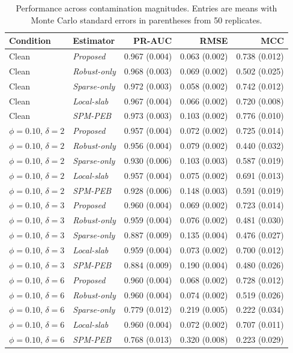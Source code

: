 \begin{table}[htbp]
\centering
\scriptsize
\setlength{\tabcolsep}{4pt}
\caption{Performance across contamination magnitudes. Entries are means with Monte Carlo standard errors in parentheses from 50 replicates.}
\label{tab:supp-magnitude}
\begin{tabular}{llrrr}
\toprule
Condition & Estimator & PR-AUC & RMSE & MCC\\
\midrule 
Clean & \emph{Proposed} & 0.967 (0.004) & 0.063 (0.002) & 0.738 (0.012)\\ 
Clean & \emph{Robust-only} & 0.968 (0.003) & 0.069 (0.002) & 0.502 (0.025)\\ 
Clean & \emph{Sparse-only} & 0.972 (0.003) & 0.058 (0.002) & 0.742 (0.012)\\ 
Clean & \emph{Local-slab} & 0.967 (0.004) & 0.066 (0.002) & 0.720 (0.008)\\ 
Clean & \emph{SPM-PEB} & 0.973 (0.003) & 0.103 (0.002) & 0.776 (0.010)\\ 
$\phi=0.10$, $\delta=2$ & \emph{Proposed} & 0.957 (0.004) & 0.072 (0.002) & 0.725 (0.014)\\ 
$\phi=0.10$, $\delta=2$ & \emph{Robust-only} & 0.956 (0.004) & 0.079 (0.002) & 0.440 (0.032)\\ 
$\phi=0.10$, $\delta=2$ & \emph{Sparse-only} & 0.930 (0.006) & 0.103 (0.003) & 0.587 (0.019)\\ 
$\phi=0.10$, $\delta=2$ & \emph{Local-slab} & 0.957 (0.004) & 0.075 (0.002) & 0.691 (0.013)\\ 
$\phi=0.10$, $\delta=2$ & \emph{SPM-PEB} & 0.928 (0.006) & 0.148 (0.003) & 0.591 (0.019)\\ 
$\phi=0.10$, $\delta=3$ & \emph{Proposed} & 0.960 (0.004) & 0.069 (0.002) & 0.723 (0.014)\\ 
$\phi=0.10$, $\delta=3$ & \emph{Robust-only} & 0.959 (0.004) & 0.076 (0.002) & 0.481 (0.030)\\ 
$\phi=0.10$, $\delta=3$ & \emph{Sparse-only} & 0.887 (0.009) & 0.135 (0.004) & 0.476 (0.027)\\ 
$\phi=0.10$, $\delta=3$ & \emph{Local-slab} & 0.959 (0.004) & 0.073 (0.002) & 0.700 (0.012)\\ 
$\phi=0.10$, $\delta=3$ & \emph{SPM-PEB} & 0.884 (0.009) & 0.190 (0.004) & 0.480 (0.026)\\ 
$\phi=0.10$, $\delta=6$ & \emph{Proposed} & 0.960 (0.004) & 0.068 (0.002) & 0.728 (0.012)\\ 
$\phi=0.10$, $\delta=6$ & \emph{Robust-only} & 0.960 (0.004) & 0.074 (0.002) & 0.519 (0.026)\\ 
$\phi=0.10$, $\delta=6$ & \emph{Sparse-only} & 0.779 (0.012) & 0.219 (0.005) & 0.222 (0.034)\\ 
$\phi=0.10$, $\delta=6$ & \emph{Local-slab} & 0.960 (0.004) & 0.072 (0.002) & 0.707 (0.011)\\ 
$\phi=0.10$, $\delta=6$ & \emph{SPM-PEB} & 0.768 (0.013) & 0.320 (0.008) & 0.223 (0.029)\\ 
\bottomrule
\end{tabular}
\end{table}
 
